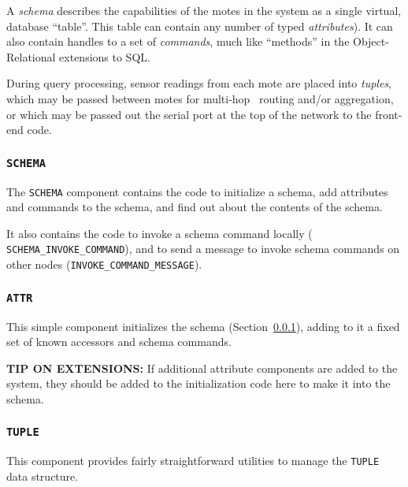 \documentclass[11pt]{article}
\begin{document}
A {\em schema} describes the capabilities of the motes in the system as a
single virtual, database ``table''.  This table can contain any number
of typed {\em attributes}).  It can also contain handles to a set of
{\em commands}, much like ``methods'' in the Object-Relational
extensions to SQL.

During query processing, sensor readings from each mote are placed
into {\em tuples}, which may be passed between motes for multi-hop~
routing and/or aggregation, or which may be passed out the serial port
at the top of the network to the front-end code.

\subsubsection{\tt SCHEMA}
\label{sec:schema}
The {\tt SCHEMA} component contains the code to initialize a schema,
add attributes and commands to the schema, and find out about the
contents of the schema.

It also contains the code to invoke a schema command locally ({\tt
SCHEMA\_INVOKE\_COMMAND}), and to send a message to invoke schema
commands on other nodes ({\tt INVOKE\_COMMAND\_MESSAGE}).

\subsubsection {\tt ATTR}
\label{sec:attr}
This simple component initializes the schema
(Section~\ref{sec:schema}), adding to it a fixed set of known
accessors and schema commands.  

{\bf TIP ON EXTENSIONS:} 
If additional attribute components are added to the system, they
should be added to the initialization code here to make it into the
schema.

\subsubsection{\tt TUPLE}
This component provides fairly straightforward utilities to manage the
{\tt TUPLE} data structure.
\end{document}
